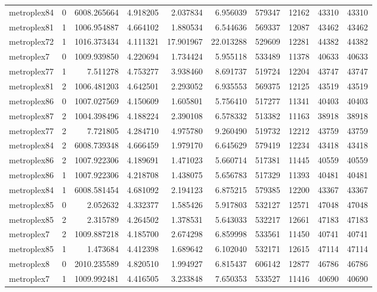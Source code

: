 \begin{longtable}{|l|r|r|r|r|r|r|r|r|r|}
metroplex84 & 0 & 6008.265664 & 4.918205 & 2.037834 & 6.956039 & 579347 & 12162 & 43310 & 43310 \\
metroplex81 & 1 & 1006.954887 & 4.664102 & 1.880534 & 6.544636 & 569337 & 12087 & 43462 & 43462 \\
metroplex72 & 1 & 1016.373434 & 4.111321 & 17.901967 & 22.013288 & 529609 & 12281 & 44382 & 44382 \\
metroplex7 & 0 & 1009.939850 & 4.220694 & 1.734424 & 5.955118 & 533489 & 11378 & 40633 & 40633 \\
metroplex77 & 1 & 7.511278 & 4.753277 & 3.938460 & 8.691737 & 519724 & 12204 & 43747 & 43747 \\
metroplex81 & 2 & 1006.481203 & 4.642501 & 2.293052 & 6.935553 & 569375 & 12125 & 43519 & 43519 \\
metroplex86 & 0 & 1007.027569 & 4.150609 & 1.605801 & 5.756410 & 517277 & 11341 & 40403 & 40403 \\
metroplex87 & 2 & 1004.398496 & 4.188224 & 2.390108 & 6.578332 & 513382 & 11163 & 38918 & 38918 \\
metroplex77 & 2 & 7.721805 & 4.284710 & 4.975780 & 9.260490 & 519732 & 12212 & 43759 & 43759 \\
metroplex84 & 2 & 6008.739348 & 4.666459 & 1.979170 & 6.645629 & 579419 & 12234 & 43418 & 43418 \\
metroplex86 & 2 & 1007.922306 & 4.189691 & 1.471023 & 5.660714 & 517381 & 11445 & 40559 & 40559 \\
metroplex86 & 1 & 1007.922306 & 4.218708 & 1.438075 & 5.656783 & 517329 & 11393 & 40481 & 40481 \\
metroplex84 & 1 & 6008.581454 & 4.681092 & 2.194123 & 6.875215 & 579385 & 12200 & 43367 & 43367 \\
metroplex85 & 0 & 2.052632 & 4.332377 & 1.585426 & 5.917803 & 532127 & 12571 & 47048 & 47048 \\
metroplex85 & 2 & 2.315789 & 4.264502 & 1.378531 & 5.643033 & 532217 & 12661 & 47183 & 47183 \\
metroplex7 & 2 & 1009.887218 & 4.185700 & 2.674298 & 6.859998 & 533561 & 11450 & 40741 & 40741 \\
metroplex85 & 1 & 1.473684 & 4.412398 & 1.689642 & 6.102040 & 532171 & 12615 & 47114 & 47114 \\
metroplex8 & 0 & 2010.235589 & 4.820510 & 1.994927 & 6.815437 & 606142 & 12877 & 46786 & 46786 \\
metroplex7 & 1 & 1009.992481 & 4.416505 & 3.233848 & 7.650353 & 533527 & 11416 & 40690 & 40690 \\

\end{longtable}
